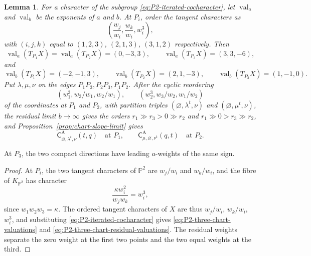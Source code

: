 \documentclass{amsart}
\newtheorem{lemma}{Lemma}
\theoremstyle{definition}
\numberwithin{equation}{section}
\begin{document}
\begin{lemma}
\label{lem:P2-three-chart-weights}
For a character of the subgroup \eqref{eq:P2-iterated-cocharacter}, let \(\operatorname{val}_a\) and \(\operatorname{val}_b\) be the exponents of \(a\) and \(b\).  At \(P_i\), order the tangent characters as
\[
 \left(\frac{w_j}{w_i},\frac{w_k}{w_i},w_i^3\right),
\]
with \((i,j,k)\) equal to \((1,2,3)\), \((2,1,3)\), \((3,1,2)\) respectively.  Then
\begin{equation}
 \operatorname{val}_a(T_{P_1}X)
 =\operatorname{val}_a(T_{P_2}X)=(0,-3,3),
 \qquad
 \operatorname{val}_a(T_{P_3}X)=(3,3,-6),
\label{eq:P2-three-chart-valuations}
\end{equation}
and
\begin{equation}
 \operatorname{val}_b(T_{P_1}X)=(-2,-1,3),\qquad
 \operatorname{val}_b(T_{P_2}X)=(2,1,-3),\qquad
 \operatorname{val}_b(T_{P_3}X)=(1,-1,0).
\label{eq:P2-three-chart-residual-valuations}
\end{equation}
Put \(\lambda,\mu,\nu\) on the edges \(P_1P_3,P_2P_3,P_1P_2\).  After the cyclic reordering
\[
 (w_1^3,w_3/w_1,w_2/w_1),\qquad
 (w_2^3,w_3/w_2,w_1/w_2)
\]
of the coordinates at \(P_1\) and \(P_2\), with partition triples \((\varnothing,\lambda^t,\nu)\) and \((\varnothing,\mu^t,\nu)\), the residual limit \(b\to\infty\) gives the orders \(r_1\gg r_3>0\gg r_2\) and \(r_1\gg0>r_3\gg r_2\), and Proposition~\ref{prop:chart-slope-limit} gives
\begin{equation}
 \mathsf C^{\mathrm A}_{\varnothing,\lambda^t,\nu}(t,q)
 \quad\text{at }P_1,
 \qquad
 \mathsf C^{\mathrm A}_{\mu,\varnothing,\nu^t}(q,t)
 \quad\text{at }P_2.
\label{eq:P2-first-two-Arbesfeld-vertices}
\end{equation}
\end{lemma}

At \(P_3\), the two compact directions have leading \(a\)-weights of the same sign.

\begin{proof}
At \(P_i\), the two tangent characters of \(\mathbb P^2\) are \(w_j/w_i\) and \(w_k/w_i\), and the fibre of \(K_{\mathbb P^2}\) has character
\[
 \frac{\kappa w_i^2}{w_jw_k}=w_i^3,
\]
since \(w_1w_2w_3=\kappa\).  The ordered tangent characters of \(X\) are thus \(w_j/w_i\), \(w_k/w_i\), \(w_i^3\), and substituting \eqref{eq:P2-iterated-cocharacter} gives \eqref{eq:P2-three-chart-valuations} and \eqref{eq:P2-three-chart-residual-valuations}.  The residual weights separate the zero weight at the first two points and the two equal weights at the third.
\end{proof}
\end{document}
